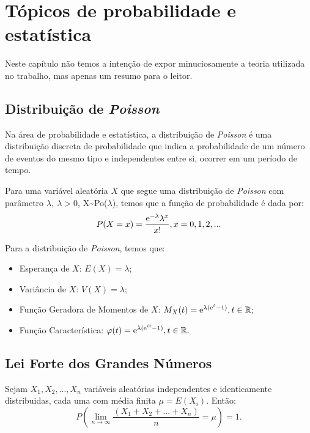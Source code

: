 \documentclass[
	12pt,
	openright,			%
	twoside,			%
	a4paper,			%
	chapter=TITLE,		%
	section=TITLE,		%
	subsection=TITLE,	%
	subsubsection=TITLE,%
	english,			%
	french,				%
	spanish,			%
	brazil				%
	]{abntex2}
\begin{document}
\section{Tópicos de probabilidade e estatística}

Neste capítulo não temos a intenção de expor minuciosamente a teoria utilizada no trabalho, mas apenas um resumo para o leitor.

\subsection{Distribuição de \textit{Poisson}}
Na área de probabilidade e estatística, a distribuição de \textit{Poisson} é uma distribuição discreta de probabilidade que indica a probabilidade de um número de eventos do mesmo tipo e independentes entre si, ocorrer em um período de tempo.

Para uma variável aleatória $X$ que segue uma distribuição de \textit{Poisson} com parâmetro $\lambda, \ \lambda > 0$, X\textasciitilde Po($\lambda$), temos que a função de probabilidade é dada por:
\begin{equation}
    P(X = x) = \frac{\mathrm{e}^{-\lambda} \lambda^{x}}{x!}, x = 0, 1, 2, ...
\end{equation}

Para a distribuição de \textit{Poisson}, temos que:
\begin{itemize}
    \item Esperança de $X$: $E(X) = \lambda;$
    \item Variância de $X$: $V(X) = \lambda;$
    \item Função Geradora de Momentos de $X$: $M_{X}(t) = \mathrm{e}^{\lambda(\mathrm{e}^{t} - 1)}, t \in \mathbb{R};$
    \item Função Característica: $\varphi (t) = \mathrm{e}^{\lambda(\mathrm{e}^{it} - 1)}, t \in \mathbb{R}.$
\end{itemize}

\subsection{Lei Forte dos Grandes Números}

\begin{theorem}
\cite{probability_ross} Sejam $X_{1}, X_{2}, ..., X_{n}$ variáveis aleatórias independentes e identicamente distribuidas, cada uma com média finita $\mu = E(X_{i})$. Então:
\begin{equation}
    P\left(\lim_{n \to \infty}\frac{(X_{1} + X_{2} + ... + X_{n})}{n} = \mu\right) = 1.
\end{equation}
\end{theorem}
\end{document}
